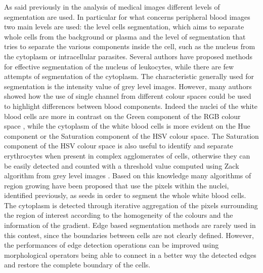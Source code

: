 \documentclass[final,a4paper,12pt,english]{UnicaPhdThesis3}
\begin{document}
	As said previously in the analysis of medical images different levels of segmentation are used. In particular for what concerns peripheral blood images two main levels are used: the level cells segmentation, which aims to separate whole cells from the background or plasma and the level of segmentation that tries to separate the various components inside the cell, such as the nucleus from the cytoplasm or intracellular parasites. Several authors have proposed methods for effective segmentation of the nucleus of leukocytes, while there are few attempts of segmentation of the cytoplasm. The characteristic generally used for segmentation is the intensity value of grey level images. However, many authors showed how the use of single channel from different colour spaces could be used to highlight differences between blood components. Indeed the nuclei of the white blood cells are more in contrast on the Green component of the RGB colour space \cite{Cseke}, while the cytoplasm of the white blood cells is more evident on the Hue component \cite{Wu} or the Saturation component \cite{Halim} of the HSV colour space. The Saturation component of the HSV colour space is also useful to identify and separate erythrocytes \cite{DiR} when present in complex agglomerates of cells, otherwise they can be easily detected and counted with a threshold value computed using Zack algorithm from grey level images \cite{Berge}. Based on this knowledge many algorithms of region growing have been proposed \cite{Kovalev, Lez98, Lez02} that use the pixels within the nuclei, identified previously, as seeds in order to segment the whole white blood cells. The cytoplasm is detected through iterative aggregation of the pixels surrounding the region of interest according to the homogeneity of the colours and the information of the gradient. Edge based segmentation methods are rarely used in this contest, since the boundaries between cells are not clearly defined. However, the performances of edge detection operations can be improved using morphological operators \cite{Piuri, Sco05} being able to connect in a better way the detected edges and restore the complete boundary of the cells. 
	
\end{document}

